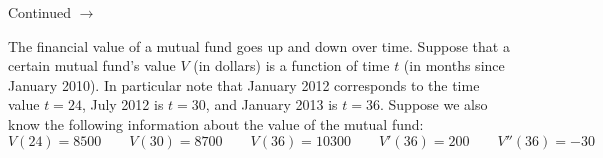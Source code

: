 \documentclass[addpoints]{exam}
\def\pageturn{\vfill
\begin{flushright}
	\begin{small}
		Continued $\rightarrow$
	\end{small}
\end{flushright}
\newpage}
\begin{document}
\begin{questions}
% 		
% 		
% 		
% 		
% 		
% 		
% 		

\pageturn

\question The financial value of a mutual fund goes up and down over time. Suppose that a certain mutual fund's value $V$ (in dollars) is a function of time $t$ (in months since January 2010). In particular note that January 2012 corresponds to the time value $t = 24$, July 2012 is $t=30$, and January 2013 is $t = 36$. Suppose we also know the following information about the value of the mutual fund: 
\[ V(24) = 8500 \qquad V(30) = 8700 \qquad V(36) = 10300 \qquad V'(36) = 200 \qquad V''(36) = -30 \] 
	\begin{parts}

\end{parts}
\end{questions}
\end{document}
